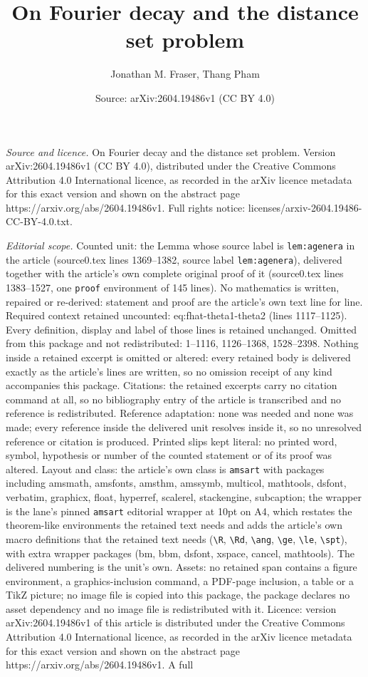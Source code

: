 \documentclass[10pt,a4paper]{amsart}
\title[On Fourier decay and the distance set problem]{On Fourier decay and the distance set problem}
\author{Jonathan M. Fraser, Thang Pham}
\date{Source: arXiv:2604.19486v1 (CC BY 4.0)}
\begin{document}
\maketitle

\noindent\emph{Source and licence.} On Fourier decay and the distance set problem. Version arXiv:2604.19486v1 (CC BY 4.0), distributed under the Creative Commons Attribution 4.0 International licence, as recorded in the arXiv licence metadata for this exact version and shown on the abstract page https://arxiv.org/abs/2604.19486v1. Full rights notice: licenses/arxiv-2604.19486-CC-BY-4.0.txt.\par\smallskip

\noindent\textit{Editorial scope.} Counted unit: the Lemma whose source label is \texttt{lem:agenera} in the article (source0.tex lines 1369--1382, source label \texttt{lem:agenera}), delivered together with the article's own complete original proof of it (source0.tex lines 1383--1527, one \texttt{proof} environment of 145 lines). No mathematics is written, repaired or re-derived: statement and proof are the article's own text line for line. Required context retained uncounted: eq:fhat-theta1-theta2 (lines 1117--1125). Every definition, display and label of those lines is retained unchanged. Omitted from this package and not redistributed: 1--1116, 1126--1368, 1528--2398. Nothing inside a retained excerpt is omitted or altered: every retained body is delivered exactly as the article's lines are written, so no omission receipt of any kind accompanies this package. Citations: the retained excerpts carry no citation command at all, so no bibliography entry of the article is transcribed and no reference is redistributed. Reference adaptation: none was needed and none was made; every reference inside the delivered unit resolves inside it, so no unresolved reference or citation is produced. Printed slips kept literal: no printed word, symbol, hypothesis or number of the counted statement or of its proof was altered. Layout and class: the article's own class is \texttt{amsart} with packages including amsmath, amsfonts, amsthm, amssymb, multicol, mathtools, dsfont, verbatim, graphicx, float, hyperref, scalerel, stackengine, subcaption; the wrapper is the lane's pinned \texttt{amsart} editorial wrapper at 10pt on A4, which restates the theorem-like environments the retained text needs and adds the article's own macro definitions that the retained text needs (\texttt{\textbackslash R}, \texttt{\textbackslash Rd}, \texttt{\textbackslash ang}, \texttt{\textbackslash ge}, \texttt{\textbackslash le}, \texttt{\textbackslash spt}), with extra wrapper packages (bm, bbm, dsfont, xspace, cancel, mathtools). The delivered numbering is the unit's own. Assets: no retained span contains a figure environment, a graphics-inclusion command, a PDF-page inclusion, a table or a TikZ picture; no image file is copied into this package, the package declares no asset dependency and no image file is redistributed with it. Licence: version arXiv:2604.19486v1 of this article is distributed under the Creative Commons Attribution 4.0 International licence, as recorded in the arXiv licence metadata for this exact version and shown on the abstract page https://arxiv.org/abs/2604.19486v1. A full 
\end{document}
